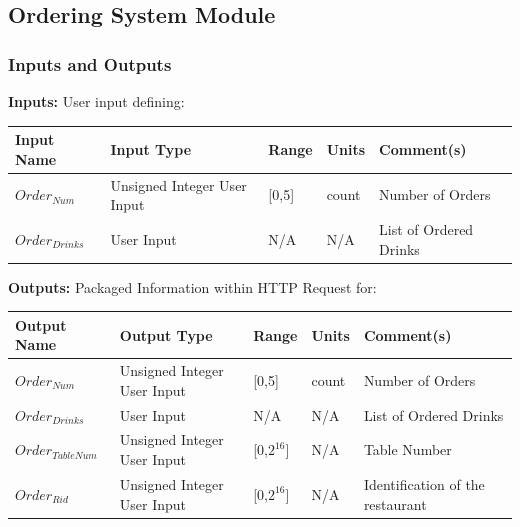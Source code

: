 \documentclass [10pt]{article}
\begin{document}
\subsection{Ordering System Module}

\subsubsection{Inputs and Outputs}

\textbf{Inputs:}  User input defining:\\

\begin{longtable}{|l|l|l|l|l|}\hline 
	\rowcolor{tableCell}\textbf{Input Name} & \textbf{Input Type} & \textbf{Range} & \textbf{Units} & \textbf{Comment(s)} \\ \hline
	$Order_{Num} $ & Unsigned Integer User Input & [0,5] & count &  Number of Orders \\ \hline
	\rowcolor{tableCell}$Order_{Drinks} $ &  User Input & N/A & N/A &  List of Ordered Drinks \\ \hline
\end{longtable}


\textbf{Outputs:} Packaged Information within HTTP Request for: \\
\begin{longtable}{|l|l|l|l|l|}\hline 
	\rowcolor{tableCell}\textbf{Output Name} & \textbf{Output Type} & \textbf{Range} & \textbf{Units} & \textbf{Comment(s)} \\ \hline
	$Order_{Num} $ & Unsigned Integer User Input & [0,5] & count &  Number of Orders \\ \hline
	\rowcolor{tableCell}$Order_{Drinks} $ &  User Input & N/A & N/A &  List of Ordered Drinks \\ \hline
	$Order_{TableNum} $ & Unsigned Integer User Input & [0,$2^{16}$] & N/A &  Table Number \\ \hline
	\rowcolor{tableCell}$Order_{Rid} $ & Unsigned Integer User Input & [0,$2^{16}$] & N/A & Identification of the restaurant \\ \hline
\end{longtable}

\end{document}
